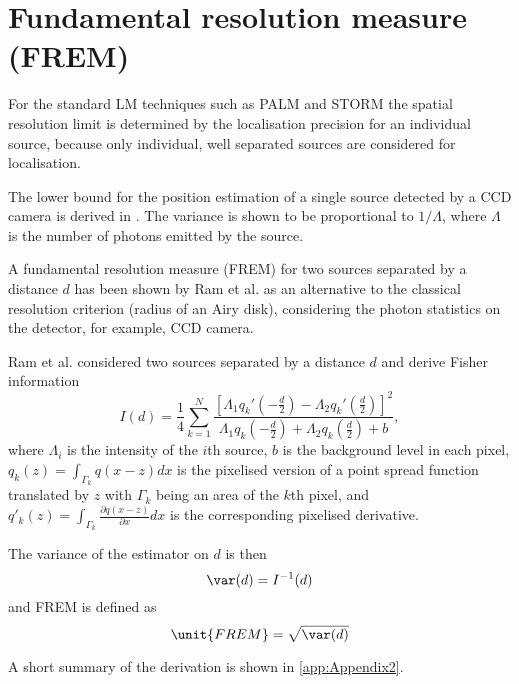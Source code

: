 
\section{Fundamental resolution measure (FREM)}

For the standard LM techniques such as PALM and STORM  the spatial resolution limit is determined by the localisation precision for an individual source, because only individual, well separated sources are considered for localisation. 

The \CR lower bound for the position estimation of a single source detected by a CCD camera is derived in \cite{Ram2006,Ram2006b}. The variance is shown to be proportional to $1/\Lambda$, where $\Lambda$ is the number of photons emitted by the source. 

A fundamental resolution measure (FREM) for two sources separated by a distance $d$ has been shown by Ram et al. \cite{Ram2006} as an alternative to the classical resolution criterion (radius of an Airy disk), considering the photon statistics on the detector, for example,  CCD camera.

Ram et al. \cite{Ram2006} considered two sources separated by a distance $d$ and derive Fisher information
%
\begin{equation}
	I(d)=\frac{1}{4}\sum_{k=1}^N\frac{\left[\Lambda_1q_k'(-\frac{d}{2})-\Lambda_2q_k'(\frac{d}{2})\right]^2}{\Lambda_1q_k(-\frac{d}{2})+\Lambda_2q_k(\frac{d}{2})+b},
	\label{eq:Ram FREM}
\end{equation}
%
where $\Lambda_i$ is the intensity of the $i$th source, $b$ is the background level in each pixel, $q_k(z)=\int_{\Gamma_k}q(x-z)dx$ is the pixelised version of a point spread function translated by $z$ with $\Gamma_k$ being an area of the $k$th pixel, and $q'_k(z)=\int_{\Gamma_k}\frac{\partial q(x-z)}{\partial x}dx$ is the corresponding pixelised derivative. 

The variance of the estimator on $d$ is then 
%
\begin{equation}
	\var(d)=I^{-1}(d)
\end{equation}
%
and FREM is defined as 
%
\begin{equation}
	\unit{FREM}=\sqrt{\var(d)}
	\label{eq:FREM}	
\end{equation}

A short summary of the derivation is shown in \autoref{app:Appendix2}. 

